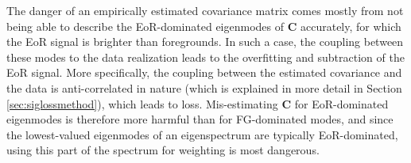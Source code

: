 \documentclass[preprint2,numberedappendix,tighten]{aastex6}  %
\begin{document}

% 








The danger of an empirically estimated covariance matrix comes mostly from not being able to describe the EoR-dominated eigenmodes of $\textbf{C}$ accurately, for which the EoR signal is brighter than foregrounds. In such a case, the coupling between these modes to the data realization leads to the overfitting and subtraction of the EoR signal. More specifically, the coupling between the estimated covariance and the data is anti-correlated in nature (which is explained in more detail in Section \ref{sec:siglossmethod}), which leads to loss. Mis-estimating $\textbf{C}$ for EoR-dominated eigenmodes is therefore more harmful than for FG-dominated modes, and since the lowest-valued eigenmodes of an eigenspectrum are typically EoR-dominated, using this part of the spectrum for weighting is most dangerous.
\end{document}
